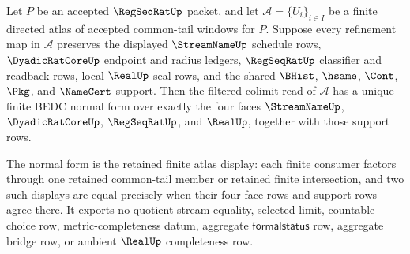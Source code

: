\begin{theorem}
\label{thm:regseqrat-common-tail-filtered-colimit-normal-form}
Let $P$ be an accepted $\RegSeqRatUp$ packet, and let $\mathcal A=\{U_i\}_{i \in I}$ be a finite directed atlas of accepted common-tail windows for $P$. Suppose every refinement map in $\mathcal A$ preserves the displayed $\StreamNameUp$ schedule rows, $\DyadicRatCoreUp$ endpoint and radius ledgers, $\RegSeqRatUp$ classifier and readback rows, local $\RealUp$ seal rows, and the shared $\BHist$, $\hsame$, $\Cont$, $\Pkg$, and $\NameCert$ support. Then the filtered colimit read of $\mathcal A$ has a unique finite BEDC normal form over exactly the four faces $\StreamNameUp$, $\DyadicRatCoreUp$, $\RegSeqRatUp$, and $\RealUp$, together with those support rows.

The normal form is the retained finite atlas display: each finite consumer factors through one retained common-tail member or retained finite intersection, and two such displays are equal precisely when their four face rows and support rows agree there. It exports no quotient stream equality, selected limit, countable-choice row, metric-completeness datum, aggregate $\mathsf{formalstatus}$ row, aggregate bridge row, or ambient $\RealUp$ completeness row.
\end{theorem}

